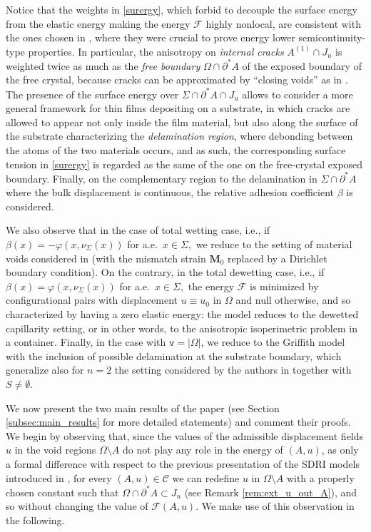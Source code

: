 \documentclass[reqno]{amsart}
\numberwithin{equation}{section}
\theoremstyle{plain}
\theoremstyle{definition}
\newcommand{\bM}{\mathbf{M}}
\newcommand{\fm}{\mathtt{v}}
\newcommand{\cF}{\mathcal{F}}
\newcommand{\p}{\partial}
\begin{document}
Notice that the weights in \eqref{surergy}, which forbid to  decouple  the surface energy from the elastic energy making the energy $\cF$ highly nonlocal, are consistent with the ones chosen in  \cite{CF:2020_arma,FFLM:2007,FFLM:2011,HP:2020_arma,HP:2021_arxiv},  where they were crucial to prove energy lower semicontinuity-type properties. In particular, the anisotropy on  \emph{internal cracks} $A^{(1)}\cap J_u$ is weighted twice as much as the  \emph{free boundary} $\Omega\cap \p^*A$ of the exposed boundary of the free crystal, because cracks can be approximated by ``closing voids'' as in \cite{CF:2020_arma,FFLM:2007, HP:2020_arma}.  The presence of the surface energy over $\Sigma\cap \p^*A\cap J_u$ allows to consider a more general framework for thin films depositing on a substrate, in which cracks  are allowed to appear not only inside the film material, but also along the surface of the substrate characterizing the \emph{delamination region}, where debonding between the atoms of the two materials occurs, and as such,  the corresponding surface tension in \eqref{surergy}  is regarded as the same of the one on the  free-crystal exposed  boundary. Finally, on the complementary  region to the delamination in $\Sigma\cap\p^*A$ where the bulk displacement is continuous,  the relative adhesion coefficient $\beta$ is considered.

We also observe that  in the case of total wetting case, i.e., if $\beta(x) = -\varphi(x,\nu_\Sigma(x))$ for a.e.\ $x\in\Sigma,$ we reduce to the setting of material voids considered in \cite{CF:2020_arma} (with the mismatch strain $\bM_0$ replaced by a Dirichlet boundary condition). On the contrary, in the total dewetting case, i.e., if $\beta(x) = \varphi(x,\nu_\Sigma(x))$ for a.e.\ $x\in\Sigma,$ the energy $\cF$ is minimized by configurational pairs with displacement $u\equiv u_0$ in $\Omega$ and null otherwise, and so characterized by having a zero elastic energy: the model reduces to the dewetted capillarity setting, or in other words, to the anisotropic isoperimetric problem in a container. Finally, in the case with $\fm=|\Omega|$, we reduce to the Griffith model with the inclusion of possible delamination at the substrate boundary, which generalize also for $n=2$ the setting considered by the authors in \cite{HP:2020_arma,HP:2021_arxiv} together with $S\neq\emptyset$.


We now present the two main results of the paper (see Section \ref{subsec:main_results} for more detailed statements) and comment their proofs. We begin by observing that, since the values of the admissible displacement fields $u$ in the void regions $\Omega\setminus A$ do not play any role in the energy of $(A,u)$, as only a formal difference with respect to the previous presentation of the SDRI models introduced in \cite{HP:2020_arma,HP:2021_arxiv}, for every $(A,u)\in\mathcal{C}$ we can redefine $u$ in $\Omega\setminus A$ with a properly chosen constant such that $\Omega\cap \p^*A \subset J_u$ (see Remark \ref{rem:ext_u_out_A}), and so without changing the value of $\cF(A,u)$. We make use of this observation in the following.
\end{document}
